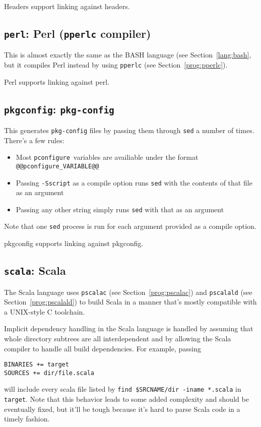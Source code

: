 \documentclass{article}
\newcommand{\pconfigure}{\texttt{pconfigure}}
\begin{document}
Headers support linking against headers.

\subsection{\texttt{perl}: Perl (\texttt{pperlc} compiler)}

This is almost exactly the same as the BASH language (see
Section~\ref{lang:bash}, but it compiles Perl instead by using
\texttt{pperlc} (see Section~\ref{prog:pperlc}).

Perl supports linking against perl.

\subsection{\texttt{pkgconfig}: \texttt{pkg-config}}

This generates \texttt{pkg-config} files by passing them through
\texttt{sed} a number of times.  There's a few rules:

\begin{itemize}
\item Most \pconfigure\ variables are availiable under the format
  \texttt{@@pconfigure\_VARIABLE@@}
\item Passing \texttt{-Sscript} as a compile option runs \texttt{sed}
  with the contents of that file as an argument
\item Passing any other string simply runs \texttt{sed} with that as
  an argument
\end{itemize}

Note that one \texttt{sed} process is run for each argument provided
as a compile option.

pkgconfig supports linking against pkgconfig.

\subsection{\texttt{scala}: Scala \label{lang:scala}}

The Scala language uses \texttt{pscalac} (see
Section~\ref{prog:pscalac}) and \texttt{pscalald} (see
Section~\ref{prog:pscalald}) to build Scala in a manner that's mostly
compatible with a UNIX-style C toolchain.

Implicit dependency handling in the Scala language is handled by
assuming that whole directory subtrees are all interdependent and by
allowing the Scala compiler to handle all build dependencies.  For example, passing
\begin{verbatim}
BINARIES += target
SOURCES += dir/file.scala
\end{verbatim}
will include every scala file listed by \texttt{find \$SRCNAME/dir
  -iname *.scala} in \texttt{target}.  Note that this behavior leads
to some added complexity and should be eventually fixed, but it'll be
tough because it's hard to parse Scala code in a timely fashion.
\end{document}
